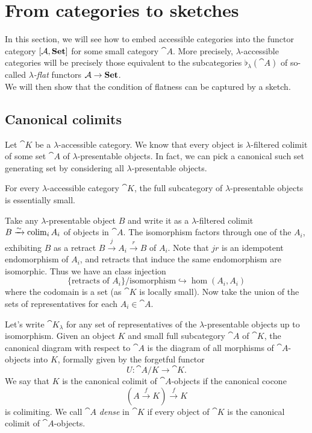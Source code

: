 \section{From categories to sketches}
\label{seq:catstoskeches}

In this section, we will see how to embed accessible categories into the functor category $[\mathcal{A},\mathbf{Set}]$ for some small category $\cat A$. More precisely, $\lambda$-accessible categories will be precisely those equivalent to the subcategories $\flat_\lambda(\cat A)$ of so-called \emph{$\lambda$-flat} functors $\mathcal{A} \to \mathbf{Set}$. \\

We will then show that the condition of flatness can be captured by a sketch.

\subsection{Canonical colimits}

Let $\cat K$ be a $\lambda$-accessible category. We know that every object is $\lambda$-filtered colimit of some set $\cat A$ of $\lambda$-presentable objects. In fact, we can pick a canonical such set generating set by considering all $\lambda$-presentable objects.

\begin{Proposition}
For every $\lambda$-accessible category $\cat K$, the full subcategory of $\lambda$-presentable objects is essentially small. 
\end{Proposition}
\begin{Proof}
Take any $\lambda$-presentable object $B$ and write it as a $\lambda$-filtered colimit $B \xrightarrow{\sim} \operatorname{colim}_i A_i$ of objects in $\cat A$. The isomorphism factors through one of the $A_i$, exhibiting $B$ as a retract $B \xrightarrow{j} A_i \xrightarrow{r} B$ of $A_i$. Note that $jr$ is an idempotent endomorphism of $A_i$, and retracts that induce the same endomorphism are isomorphic. Thus we have an class injection
\[ \{ \text{retracts of } A_i \}/\text{isomorphism} \hookrightarrow \hom(A_i,A_i) \]
where the codomain is a set (as $\cat K$ is locally small). Now take the union of the sets of representatives for each $A_i \in \cat A$.
\end{Proof}

Let's write $\cat K_\lambda$ for any set of representatives of the $\lambda$-presentable objects up to isomorphism. Given an object $K$ and small full subcategory $\cat A$ of $\cat K$, the canonical diagram with respect to $\cat A$ is the diagram of all morphisms of $\cat A$-objects into $K$, formally given by the forgetful functor
\[ U : \cat A/K \to \cat K. \]
We say that $K$ is the canonical colimit of $\cat A$-objects if the canonical cocone
\[ (A \xrightarrow{f} K) \xrightarrow{f} K \]
is colimiting. We call $\cat A$ \emph{dense} in $\cat K$ if every object of $\cat K$ is the canonical colimit of $\cat A$-objects.

